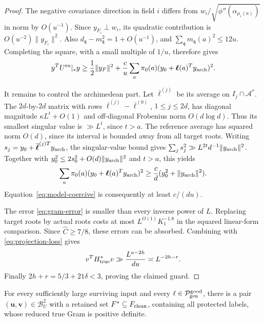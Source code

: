 \begin{proof}
The negative covariance direction in field \(i\) differs from
\(w_i/\sqrt{\phi''(\alpha_{\mu_i(a)})}\) in norm by \(O(u^{-1})\).
Since \(y_{F_i}\perp w_i\), its quadratic contribution is
\(O(u^{-2})\|y_{F_i}\|^2\).  Also
\(d_{\mathfrak q}-m_{\mathfrak q}^2=1+O(u^{-1})\), and
\(\sum_{\mathfrak q}m_{\mathfrak q}(a)^2\le12u\).
Completing the square, with a small multiple of \(1/u\), therefore
gives
\begin{equation}\label{eq:model-coercive}
 y^TU^{\rm ex}|_*y
 \ge\frac12\|y_F\|^2+
       \frac c u\sum_a\pi_0(a)
             (y_0+\boldsymbol\ell(a)^Ty_{\rm arch})^2.
\end{equation}

It remains to control the archimedean part.  Let
\(\overline{\boldsymbol\ell}^{(j)}\) be its average on
\(I_j\cap\mathcal A^*\).  The \(2d\)-by-\(2d\) matrix with
rows \(\overline{\boldsymbol\ell}^{(j)}-
\overline{\boldsymbol\ell}^{(0)}\), \(1\le j\le2d\), has
diagonal magnitude \(\kappa L^t+O(1)\) and off-diagonal Frobenius
norm \(O(d\log d)\).  Thus its smallest singular value is
\(\gg L^t\), since \(t>a\).
The reference average has squared norm \(O(d)\), since its
interval is bounded away from all target roots.
Writing \(s_j=y_0+
\overline{\boldsymbol\ell}^{(j)T}y_{\rm arch}\), the singular-value
bound gives
\(\sum_j s_j^2\gg L^{2t}d^{-1}\|y_{\rm arch}\|^2\).
Together with
\(y_0^2\le2s_0^2+O(d)\|y_{\rm arch}\|^2\) and \(t>a\), this yields
\[
 \sum_a\pi_0(a)(y_0+\boldsymbol\ell(a)^Ty_{\rm arch})^2
       \ge\frac c d(y_0^2+\|y_{\rm arch}\|^2).
\]
Equation~\eqref{eq:model-coercive} is consequently at least
\(c/(du)\).

The error \eqref{eq:gram-error} is smaller than every inverse power
of \(L\).  Replacing target roots by actual roots costs at most
\(L^{O(1)}K_1^{-1.8}\) in the squared linear-form comparison.
Since \(\widehat C\ge7/8\), these errors can be absorbed.  Combining
with \eqref{eq:projection-loss} gives
\[
 v^TH_{\rm true}^*v\gg
        \frac{L^{a-2h}}{du}\asymp L^{-2h-r}.
\]
Finally \(2h+r=5/3+21\delta<3\), proving the claimed guard.
\end{proof}

\begin{corollary}\label{cor:pair-exists}
For every sufficiently large surviving input and every
\(\ell\in\mathcal P_{\rm gen}^{\rm good}\), there is a pair
\((\mathbf u,\mathbf v)\in\mathcal B_U^2\) with a retained set
\(F^*\subseteq F_{\rm clean}\), containing all protected labels,
whose reduced true Gram is positive definite.
\end{corollary}

